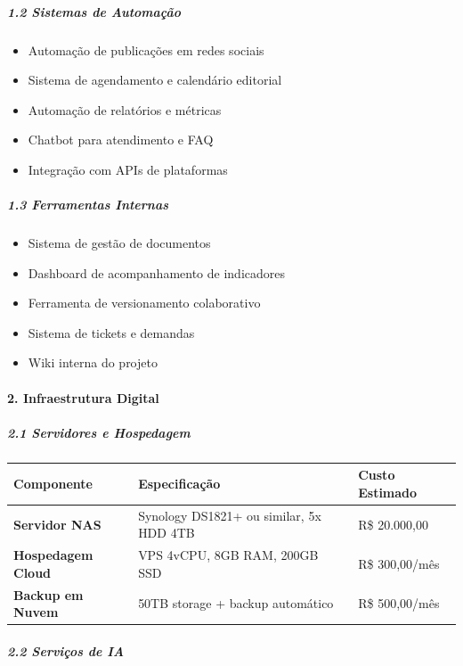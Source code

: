 \subparagraph{1.2 Sistemas de Automação}

\begin{itemize}
\item[$\square$] Automação de publicações em redes sociais
\item[$\square$] Sistema de agendamento e calendário editorial
\item[$\square$] Automação de relatórios e métricas
\item[$\square$] Chatbot para atendimento e FAQ
\item[$\square$] Integração com APIs de plataformas
\end{itemize}

\subparagraph{1.3 Ferramentas Internas}

\begin{itemize}
\item[$\square$] Sistema de gestão de documentos
\item[$\square$] Dashboard de acompanhamento de indicadores
\item[$\square$] Ferramenta de versionamento colaborativo
\item[$\square$] Sistema de tickets e demandas
\item[$\square$] Wiki interna do projeto
\end{itemize}

\paragraph{2. Infraestrutura Digital}

\subparagraph{2.1 Servidores e Hospedagem}

\bigskip\noindent
\begin{tabular}{p{}p{}p{}}
\toprule
Componente & Especificação & Custo Estimado \\
\hline
\textbf{Servidor NAS} & Synology DS1821+ ou similar, 5x HDD 4TB & R\$ 20.000,00 \\
\textbf{Hospedagem Cloud} & VPS 4vCPU, 8GB RAM, 200GB SSD & R\$ 300,00/mês \\
\textbf{Backup em Nuvem} & 50TB storage + backup automático & R\$ 500,00/mês \\
\bottomrule
\end{tabular}

\bigskip

\subparagraph{2.2 Serviços de IA}

